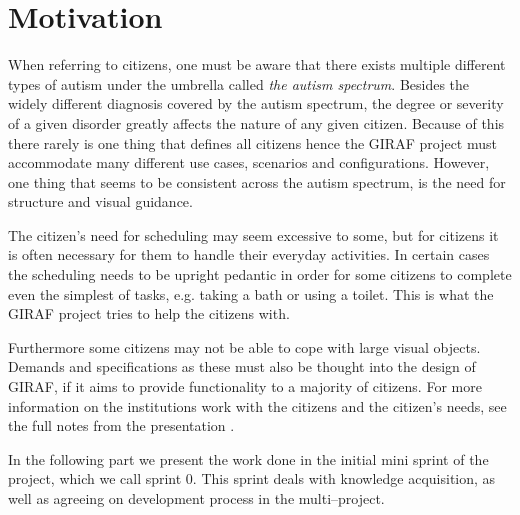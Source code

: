 \section{Motivation}
When referring to citizens, one must be aware that there exists multiple different types of autism under the umbrella called \textit{the autism spectrum}.
Besides the widely different diagnosis covered by the autism spectrum, the degree or severity of a given disorder greatly affects the nature of any given citizen.
Because of this there rarely is one thing that defines all citizens hence the GIRAF project must accommodate many different use cases, scenarios and configurations.
However, one thing that seems to be consistent across the autism spectrum, is the need for structure and visual guidance.

The citizen's need for scheduling may seem excessive to some, but for citizens it is often necessary for them to handle their everyday activities.
In certain cases the scheduling needs to be upright pedantic in order for some citizens to complete even the simplest of tasks, e.g. taking a bath or using a toilet.
This is what the GIRAF project tries to help the citizens with.

Furthermore some citizens may not be able to cope with large visual objects.
Demands and specifications as these must also be thought into the design of GIRAF, if it aims to provide functionality to a majority of citizens.
For more information on the institutions work with the citizens and the citizen's needs, see the full notes from the presentation \cite{GIRAF20161stMeeting}.

In the following part we present the work done in the initial mini sprint of the project, which we call sprint 0.
This sprint deals with knowledge acquisition, as well as agreeing on development process in the multi--project.

